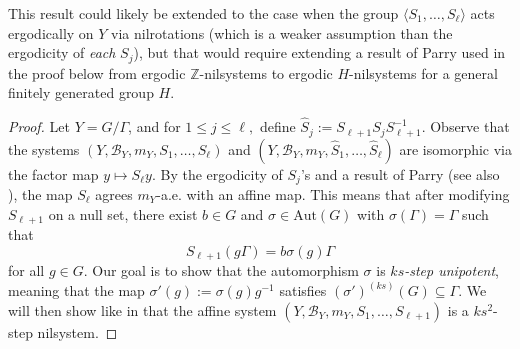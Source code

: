 \documentclass[11pt]{amsart}
\theoremstyle{definition}
\newcommand{\Z}{{\mathbb Z}}
\newcommand{\CB}{{\mathcal B}}
\newcommand{\Aut}{{\text{Aut}}}
\newcommand{\inv}{^{-1}}
\newcommand{\1}{{\mathbf{1}}}
\begin{document}
This result could likely be extended to the case when the group $\langle S_1, \ldots, S_{\ell}\rangle$ acts ergodically on $Y$ via nilrotations (which is a weaker assumption than the ergodicity of \textit{each} $S_j$), but that would require extending a result of Parry used in the proof below from ergodic $\Z$-nilsystems to ergodic $H$-nilsystems for a general finitely generated group $H$.


\begin{proof}
Let $Y=G/\Gamma$, and for $1\leq j\leq \ell,$ define $\hat S_j:=S_{\ell+1} S_j S_{\ell+1}\inv$.
Observe that the systems $(Y, \CB_Y, m_Y, S_1, \ldots, S_\ell)$ and $(Y, \CB_Y, m_Y, \hat S_1, \ldots, \hat S_\ell)$ are isomorphic via the factor map $y\mapsto S_\ell y$. By the ergodicity of $S_j$'s and a result of Parry \cite{Parry71} (see also \cite[Theorem~1.4]{Parry73}), the map $S_\ell$ agrees $m_Y$-a.e. with an affine map. This means that after modifying $S_{\ell+1}$ on a null set, there exist $b\in G$ and $\sigma\in\Aut(G)$ with $\sigma(\Gamma) = \Gamma$ such that  
$$S_{\ell+1}(g\Gamma) = b\sigma(g)\Gamma$$ 
for all $g\in G$. Our goal is to show that 
the automorphism $\sigma$ is \textit{$ks$-step unipotent}, meaning that the map $\sigma'(g):=\sigma(g)g\inv$ satisfies $(\sigma')^{(ks)}(G) \subseteq \Gamma$. 
We will then show like in
\cite[Chapter 11, Proposition~19]{HK18} that 
the affine system $(Y, \CB_Y, m_Y, S_1, \ldots, S_{\ell+1})$ is a $ks^2$-step nilsystem. 


\end{proof}
\end{document}
